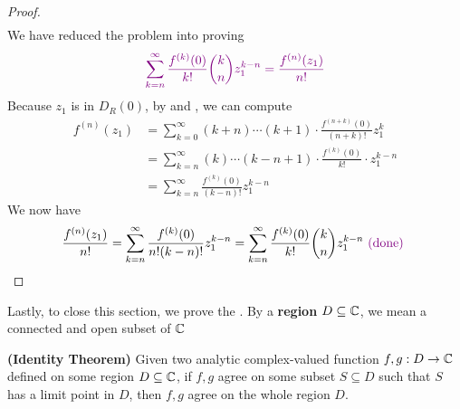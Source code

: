 \documentclass{report}
\begin{document}
\begin{proof}
\begin{align*}
\end{align*}
We have reduced the problem into proving 
\begin{align*}
\textcolor{violet}{\sum_{k=n}^\infty \frac{f^{(k)}(0)}{k!} \binom{k}{n}z_1^{k-n}=\frac{f^{(n)}(z_1)}{n!}}
\end{align*}
Because $z_1$ is in $D_R(0)$, by  and , we can compute 
\begin{align*}
f^{(n)}(z_1)&=\sum_{k=0}^{\infty}(k+n)\cdots (k+1)\cdot  \frac{f^{(n+k)}(0)}{(n+k)!}z_1^{k}\\
&=\sum_{k=n}^\infty (k)\cdots (k-n+1) \cdot \frac{f^{(k)}(0)}{k!} \cdot z_1^{k-n}\\
&=\sum _{k=n}^{\infty}\frac{f^{(k)}(0)}{(k-n)!}z_1^{k-n}
\end{align*}
We now have 
\begin{align*}
\frac{f^{(n)}(z_1)}{n!}= \sum_{k=n}^{\infty} \frac{f^{(k)}(0)}{n!(k-n)!}z_1^{k-n}= \sum_{k=n}^{\infty} \frac{f^{(k)}(0)}{k!}\binom{k}{n}z_1^{k-n} \textcolor{violet}{\text{ (done) }}
\end{align*}
\end{proof}
\begin{mdframed}
Lastly, to close this section, we prove the . By a \textbf{region $D\subseteq \mathbb{C}$}, we mean a connected and open subset of $\mathbb{C}$
\end{mdframed}
\begin{theorem}
\label{Identity Theorem}
\textbf{(Identity Theorem)} Given two analytic complex-valued function $f,g:D\rightarrow \mathbb{C}$ defined on some region $D\subseteq \mathbb{C}$, if $f,g$ agree on some subset $S \subseteq D$ such that $S$ has a limit point in $D$, then  $f,g$ agree on the whole region $D$.
\end{theorem}
\end{document}
